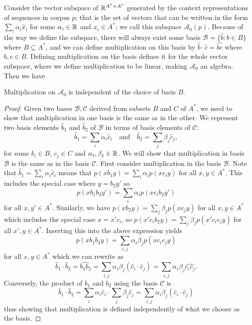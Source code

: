 \documentclass[12pt]{report}
\begin{document}
Consider the vector subspace of $\mathbb{R}^{A^* \times A^*}$ generated by the context representations of sequences in corpus $p$; that is the set of vectors that can be written in the form $\sum_i \alpha_i \hat{x}_i$ for some $\alpha_i \in \mathbb{R}$  and $x_i \in A^*$; we call this subspace $\mathcal{A}_0(p)$. Because of the way we define the subspace, there will always exist some basis $\mathcal{B} = \{\hat{b} : b \in B\}$ where $B \subseteq A^*$, and we can define multiplication on this basis by $\hat{b}\cdot\hat{c} = \widehat{bc}$ where $b,c \in B$. Defining multiplication on the basis defines it for the whole vector subspace, where we define multiplication to be linear, making $\mathcal{A}_0$ an algebra.
Then we have
\begin{prop}
Multiplication on $\mathcal{A}_0$ is independent of the choice of basis $B$.
\end{prop}
\begin{proof}
Given two bases $\mathcal{B , C}$ derived from subsets $B$ and $C$ of $A^*$, we need to show that multiplication in one basis is the same as in the other. We represent two basis elements $\hat{b}_1$ and $\hat{b}_2$ of $\mathcal{B}$ in terms of basis elements of $\mathcal{C}$:
$$\hat{b}_1 = \sum_i \alpha_i \hat{c}_i \quad\text{and}\quad
\hat{b}_2 = \sum_j \beta_j \hat{c}_j,$$
for some $b_i \in B$, $c_j \in C$ and $\alpha_i, \beta_j  \in \mathbb{R}$.
We will show that multiplication in basis $\mathcal{B}$ is the same as in the basis $\mathcal{C}$. First consider multiplication in the basis $\mathcal{B}$. Note that $\hat{b}_1 = \sum_i \alpha_i \hat{c}_i$ means that $p(xb_1y) = \sum_i \alpha_i p(xc_iy)$ for all $x,y \in A^*$. This includes the special case where $y = b_2y'$ so $$p(xb_1b_2y') = \sum_i \alpha_i p(xc_ib_2y')$$ for all $x, y' \in A^*$.
Similarly, we have $p(xb_2y) = \sum_j \beta_j p(xc_jy)$ for all $x,y \in A^*$ which includes the special case $x = x'c_i$, so $p(x'c_ib_2y) = \sum_j \beta_j p(x'c_ic_jy)$ for all $x',y \in A^*$. Inserting this into the above expression yields
$$p(xb_1b_2y) = \sum_{i,j} \alpha_i\beta_j p(xc_ic_jy)$$
for all $x,y \in A^*$ which we can rewrite as
$$\hat{b}_1\cdot\hat{b}_2 = \widehat{b_1b_2} = \sum_{i,j}\alpha_i\beta_j (\hat{c}_i\cdot\hat{c}_j)
= \sum_{i,j}\alpha_i\beta_j \widehat{c_ic_j}.$$
Conversely, the product of $b_1$ and $b_2$ using the basis $\mathcal{C}$ is
$$\hat{b}_1\cdot \hat{b}_2 = \sum_i \alpha_i \hat{c}_i \cdot \sum_j \beta_j \hat{c}_j =  \sum_{i,j}\alpha_i\beta_j (\hat{c}_i\cdot\hat{c}_j)$$
thus showing that multiplication is defined independently of what we choose as the basis.
\end{proof}
\end{document}
